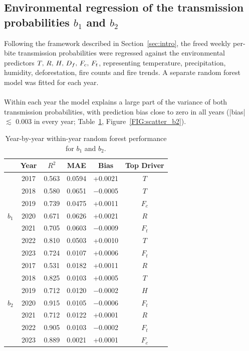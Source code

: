 \documentclass[a4paper,fleqn]{cas-dc}
\begin{document}
\subsection{Environmental regression of the transmission probabilities $b_1$ and $b_2$}
\label{sec:results_regression}
Following the framework described in Section~\ref{sec:intro}, the freed weekly per-bite transmission probabilities were regressed against the environmental predictors $T,\,R,\,H,\,D_f,\\\,F_c,\,F_t$, representing temperature, precipitation, humidity, deforestation, fire counts and fire trends. A separate random forest model was fitted for each year.
\\\\
Within each year the model explains a large part of the variance of both transmission probabilities, with prediction bias close to zero in all years (|bias| $\lesssim$ 0.003 in every year; Table~\ref{tbl:regression}, Figure~\ref{FIG:scatter_b2}).
\begin{table}[H]
\centering
\caption{Year-by-year within-year random forest performance for $b_1$ and $b_2$.}
\label{tbl:regression}
\begin{tabular}{cccccc}
\toprule
& Year & $R^2$ & MAE & Bias & Top Driver\\
\midrule
\multirow{7}{*}{$b_1$}
 & 2017 & 0.563 & 0.0594 & +0.0021 & $T$\\
 & 2018 & 0.580 & 0.0651 & $-$0.0005 & $T$\\
 & 2019 & 0.739 & 0.0475 & +0.0011 & $F_c$\\
 & 2020 & 0.671 & 0.0626 & +0.0021 & $R$\\
 & 2021 & 0.705 & 0.0603 & $-$0.0009 & $F_t$\\
 & 2022 & 0.810 & 0.0503 & +0.0010 & $T$\\
 & 2023 & 0.724 & 0.0107 & +0.0006& $F_t$\\
\midrule
\multirow{7}{*}{$b_2$}
 & 2017 & 0.531 & 0.0182 & +0.0011 & $R$\\
 & 2018 & 0.825 & 0.0103 & +0.0005 & $T$\\
 & 2019 & 0.712 & 0.0120 & $-$0.0002 & $H$\\
 & 2020 & 0.915 & 0.0105 & $-$0.0006 & $F_t$\\
 & 2021 & 0.712 & 0.0122 & +0.0001 & $R$\\
 & 2022 & 0.905 & 0.0103 & $-$0.0002 & $F_t$\\
 & 2023 & 0.889 & 0.0021 & +0.0001 & $F_c$\\
\bottomrule
\end{tabular}
\end{table}
\vspace{0.6cm}
\end{document}
